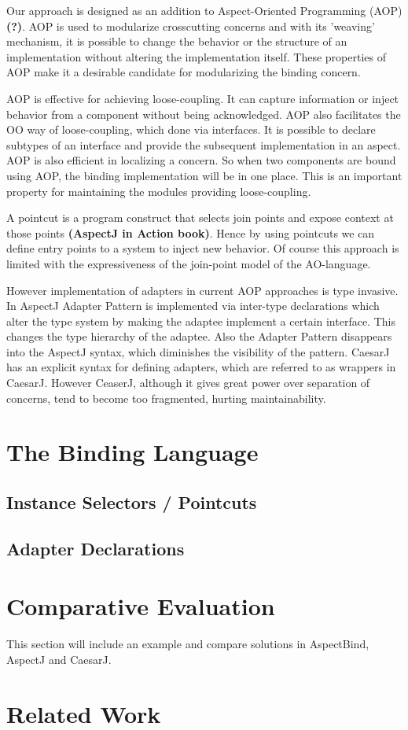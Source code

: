 \documentclass{llncs}
\begin{document}
Our approach is designed as an addition to Aspect-Oriented Programming (AOP)\textbf{(?)}. AOP is used to modularize crosscutting
concerns and with its 'weaving' mechanism, it is possible to change the behavior or the structure of an implementation without altering the
implementation itself. These properties of AOP make it a desirable candidate for modularizing the binding concern.

AOP is effective for achieving loose-coupling. It
can capture information or inject behavior from a component without being
acknowledged. AOP also facilitates the OO way of loose-coupling, which done via
interfaces. It is possible to declare subtypes of an interface and provide the
subsequent implementation in an aspect.  AOP is also efficient in localizing a concern. So when two components are bound using
AOP, the binding implementation will be in one place. This is an important
property for maintaining the modules providing loose-coupling. 

\textcolor[rgb]{0.50,0.50,0.50}{A pointcut is a program construct that selects join points and expose context at
those points \textbf{(AspectJ in Action book)}. Hence by using pointcuts we can
define entry points to a system to inject new behavior. Of course this approach
is limited with the expressiveness of the join-point model of the AO-language. }

However implementation of adapters in current AOP approaches is type invasive. In AspectJ Adapter Pattern is implemented via inter-type declarations which alter the type system by making the adaptee implement a certain interface. This changes the type hierarchy of the adaptee. Also the Adapter Pattern disappears into the AspectJ syntax, which diminishes the visibility of the pattern. CaesarJ has an explicit syntax for defining adapters, which are referred to as wrappers in CaesarJ. However CeaserJ, although it gives great power over separation of concerns, tend to become too fragmented, hurting maintainability. 


\section{The Binding Language}
\subsection{Instance Selectors / Pointcuts}
\subsection{Adapter Declarations}


\section{Comparative Evaluation}
This section will include an example and compare solutions in AspectBind, AspectJ and CaesarJ.



\section{Related Work}
\end{document}
